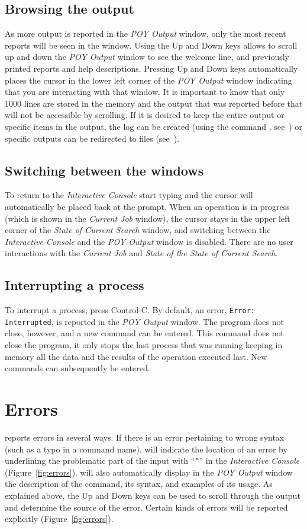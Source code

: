 \subsection{Browsing the output}
As more output is reported in the \emph{POY Output} window, only the most recent reports will be seen in the window. Using the Up and Down keys allows to scroll up and down the \emph{POY Output} window to see the welcome line, and previously printed reports and help descriptions. Pressing Up and Down keys automatically places the cursor in the lower left corner of the \emph{POY Output} window indicating that you are interacting with that window. It is important to know that only 1000 lines are stored in the memory and the output that was reported before that will not be accessible by scrolling. If it is desired to keep the entire output or specific items in the output, the log can be created (using the command , see~) or specific outputs can be redirected to files (see~).

\subsection{Switching between the windows}
To return to the \emph{Interactive Console} start typing and the cursor will automatically be placed back at the \poy prompt. When an operation is in progress (which is shown in the \emph{Current Job} window), the cursor stays in the upper left corner of the \emph{State of Current Search} window, and switching between the \emph{Interactive Console} and the \emph{POY Output} window is disabled. There are no user interactions with the \emph{Current Job} and \emph{State of the State of Current Search}.

\subsection{Interrupting a process}
To interrupt a process, press Control-C. By default, an error, \texttt{Error:}\\ \texttt{Interrupted}, is reported in the \emph{POY Output} window. The program does not close, however, and a new command can be entered. This command does not close the program, it only stops the last process that was running keeping in memory all the data and the results of the operation executed last. New commands can subsequently be entered.

\section{Errors}
\poy reports errors in several ways. If there is an error pertaining to wrong syntax (such as a typo in a command name), \poy will indicate the location of an error by underlining the problematic part of the input with ``\texttt{\^}'' in the \emph{Interactive Console} (Figure~\ref{fig:errors}). \poy will also automatically display in the \emph{POY Output} window the description of the command, its syntax, and examples of its usage. As explained above, the Up and Down keys can be used to scroll through the output and determine the source of the error. Certain kinds of errors will be reported explicitly (Figure~\ref{fig:errors}).

